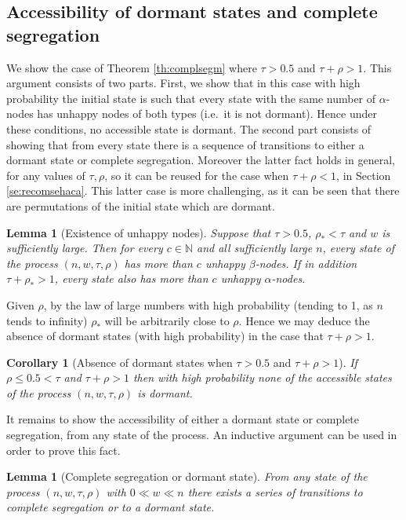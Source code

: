 \documentclass[11pt]{article}
\theoremstyle{plain}
\newtheorem{lem}[thm]{Lemma}
\newtheorem{coro}[thm]{Corollary}
\numberwithin{equation}{subsection}
\newcommand{\Nat}{\mathbb{N}}
\begin{document}
\subsection{Accessibility of dormant states and complete segregation}\label{subse:accdorcose}
We show  the case of Theorem \ref{th:complsegm} where $\tau>0.5$ and
$\tau+\rho>1$. This argument consists of two parts. First, we show that in this case
with high probability the initial state is such that
every state with the same number of $\alpha$-nodes has unhappy nodes of both types (i.e.\ it is not dormant).
Hence under these conditions, no accessible state is dormant.
The second part consists of showing that from every state there is a sequence of transitions to either a dormant state 
or complete segregation. Moreover the latter fact holds in general, for any values of $\tau,\rho$, so it can be reused for the case when
$\tau+\rho<1$, in Section \ref{se:recomsehaca}. This latter case is more challenging, 
as it can be seen that there are permutations of the initial state which are dormant.
\begin{lem}[Existence of unhappy nodes]\label{coro:exiunhangen}
Suppose that $\tau>0.5$, $\rho_{\ast}<\tau$  and $w$ is sufficiently large.
Then for every $c\in\Nat$ and
all sufficiently large $n$, every state of the process
$(n, w, \tau, \rho)$ has more than $c$ unhappy $\beta$-nodes.
If in addition $\tau+\rho_{\ast}>1$, every state also has 
more than $c$ unhappy $\alpha$-nodes.
\end{lem}

Given $\rho$, by the law of large numbers with high probability 
(tending to 1, as $n$ tends to infinity)
$\rho_{\ast}$ will be arbitrarily close to $\rho$. 
Hence we may deduce the absence of dormant states
(with high probability) in the case that $\tau+\rho>1$.
\begin{coro}[Absence of dormant states when $\tau>0.5$ and $\tau+\rho>1$]\label{coro:absdormst.g}
If $\rho\leq 0.5<\tau$ and $\tau+\rho>1$  then
with high probability none of the accessible states of
the process $(n, w, \tau, \rho)$
is dormant.
\end{coro}

It remains to show the accessibility of either a dormant state or
complete segregation, from any state of the process.
An inductive argument can be used in order to prove this fact.


\begin{lem}[Complete segregation or dormant state]\label{coro:inevcompsegd}
From any state of the process $(n, w, \tau, \rho)$ with $0\ll w\ll n$
there exists a series of transitions to complete segregation or to a dormant state.
\end{lem}
\end{document}
